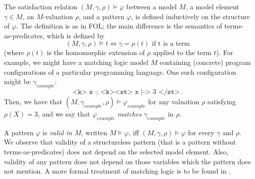 The satisfaction relation $(M, \gamma, \rho) \vDash \varphi$ between a model $M$, a model element $\gamma \in M$,
an $M$-valuation $\rho$, and a pattern $\varphi$, is defined inductively on the structure of $\varphi$.
The definition is as in FOL; the main difference is the semantics of terms-as-predicates, which is defined by
\begin{equation*}
    (M, \gamma, \rho) \vDash t \iff \gamma = \rho(t) \text{ if t is a term}
\end{equation*}
(where $\rho(t)$ is the homomorphic extension of $\rho$ applied to the term $t$).
For example, we might have a matching logic model $M$ containing (concrete) program configurations
of a particular programming language.
One such configuration might be $\gamma_{\mathit{example}}$:
\begin{equation*}
    \texttt{<k> x--; <k><st> x} \texttt{ |-> } 3\texttt{ </st>} \, .
\end{equation*}
Then, we have that $(M, \gamma_{\mathit{example}}, \rho) \vDash \varphi_{\mathit{example}}$
for any valuation $\rho$ satisfying $\rho(X) = 3$, and we say that
$\varphi_{\mathit{example}}$ \emph{matches} $\gamma_{\mathit{example}}$ in $\rho$.


A pattern $\varphi$ is \emph{valid in $M$}, written $M \vDash \varphi$, iff $(M, \gamma, \rho) \vDash \varphi$
for every $\gamma$ and $\rho$.
We observe that validity of a structureless pattern (that is a pattern without terms-as-predicates) does not depend on the selected model element.
Also, validity of any pattern does not depend on those variables which the pattern does not mention.
A more formal treatment of matching logic is to be found in .


